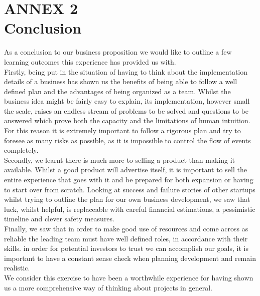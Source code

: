 \documentclass[11pt]{article}
\begin{document}

\section{ANNEX 2 \\ Conclusion}
As a conclusion to our business proposition we would like to outline a few learning outcomes this experience has provided us with.\\

\noindent Firstly, being put in the situation of having to think about the implementation details of a business has shown us the benefits of being able to follow a well defined plan and the advantages of being organized as a team. Whilst the business idea might be fairly easy to explain, its implementation, however small the scale, raises an endless stream of problems to be solved and questions to be answered which prove both the capacity and the limitations of human intuition. For this reason it is extremely important to follow a rigorous plan and try to foresee as many risks as possible, as it is impossible to control the flow of events completely. \\

\noindent Secondly, we learnt there is much more to selling a product than making it available. Whilst a good product will advertise itself, it is important to sell the entire experience that goes with it and be prepared for both expansion or having to start over from scratch. Looking at success and failure stories of other startups whilst trying to outline the plan for our own business development, we saw that luck, whilst helpful, is replaceable with careful financial estimations, a pessimistic timeline and clever safety measures. \\

\noindent Finally, we saw that in order to make good use of resources and come across as reliable the leading team must have well defined roles, in accordance with their skills. in order for potential investors to trust we can accomplish our goals, it is important to have a constant sense check when planning development and remain realistic.\\

\noindent We consider this exercise to have been a worthwhile experience for having shown us a more comprehensive way of thinking about projects in general.
\end{document}
